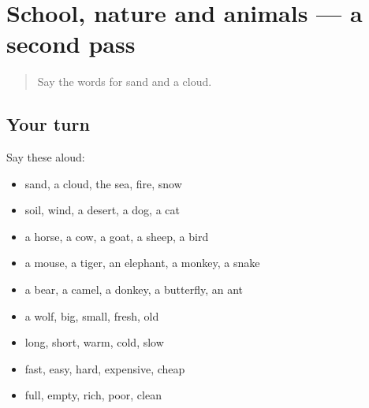 \section[(dialogue)]{School, nature and animals — a second pass}

\label{lesson:FA-R61-second-pass-school-nature-and-animals}



\begin{quote}
Say the words for sand and a cloud.
\end{quote}

\subsection*{Your turn}
Say these aloud:

\begin{itemize}
\raggedright
  \item sand, a cloud, the sea, fire, snow
  \item soil, wind, a desert, a dog, a cat
  \item a horse, a cow, a goat, a sheep, a bird
  \item a mouse, a tiger, an elephant, a monkey, a snake
  \item a bear, a camel, a donkey, a butterfly, an ant
  \item a wolf, big, small, fresh, old
  \item long, short, warm, cold, slow
  \item fast, easy, hard, expensive, cheap
  \item full, empty, rich, poor, clean
\end{itemize}

